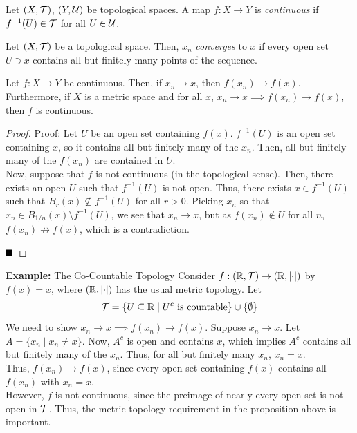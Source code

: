 
\begin{definition}
    Let $(X, \cal{T})$, $(Y, \cal{U})$ be topological spaces. A map $f : X \to Y$ is \emph{continuous} if $f^{-1}(U) \in \cal{T}$ for all $U \in \cal{U}$.
\end{definition}

\begin{definition}
    Let $(X, \cal{T})$ be a topological space. Then, $x_n$ \emph{converges} to $x$ if every open set $U \ni x$ contains all but finitely many points of the sequence.
\end{definition}

\begin{lemma}
    Let $f : X \to Y$ be continuous. Then, if $x_n \to x$, then $f(x_n) \to f(x)$. Furthermore, if $X$ is a metric space and for all $x$, $x_n \to x \implies f(x_n) \to f(x)$, then $f$ is continuous.
\end{lemma}
\begin{proof}{Proof:}
    Let $U$ be an open set containing $f(x)$. $f^{-1}(U)$ is an open set containing $x$, so it contains all but finitely many of the $x_n$. Then, all but finitely many of the $f(x_n)$ are contained in $U$.\\

    Now, suppose that $f$ is not continuous (in the topological sense). Then, there exists an open $U$ such that $f^{-1}(U)$ is not open. Thus, there exists $x \in f^{-1}(U)$ such that $B_r(x) \not\subseteq f^{-1}(U)$ for all $r > 0$. Picking $x_n$ so that $x_n \in B_{1/n}(x) \setminus f^{-1}(U)$, we see that $x_n \to x$, but as $f(x_n) \notin U$ for all $n$, $f(x_n) \not\to f(x)$, which is a contradiction.

    $\qed$
\end{proof}

\begin{example}{\textbf{Example:} The Co-Countable Topology}
    Consider $f : (\R, \cal{T}) \to (\R, \abs{\cdot})$ by $f(x) = x$, where $(\R, \abs{\cdot})$ has the usual metric topology. Let
    \[ \cal{T} = \{U \subseteq \R \mid U^{c} \tt{ is countable}\} \cup \{\emptyset\} \]
    We need to show $x_n \to x \implies f(x_n) \to f(x)$. Suppose $x_n \to x$. Let $A = \{x_n \mid x_n \neq x\}$. Now, $A^{c}$ is open and contains $x$, which implies $A^{c}$ contains all but finitely many of the $x_n$. Thus, for all but finitely many $x_n$, $x_n = x$.\\

    Thus, $f(x_n) \to f(x)$, since every open set containing $f(x)$ contains all $f(x_n)$ with $x_n = x$.\\

    However, $f$ is not continuous, since the preimage of nearly every open set is not open in $\cal{T}$. Thus, the metric topology requirement in the proposition above is important.
\end{example}

